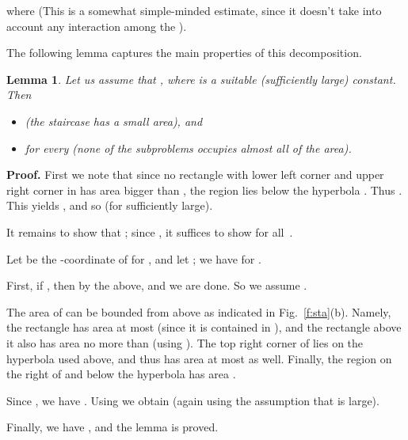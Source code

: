 \documentclass[11pt]{article}
\newtheorem{lemma}[theorem]{Lemma}
\newcommand{\qed}{\hspace{\stretch{1}}}
\newenvironment{proof}{\vspace{-.25\baselineskip}\noindent\textbf{Proof.}
}{\qed\par\medskip}
\begin{document}
where  (This is a somewhat simple-minded estimate, since it doesn't take
into account any interaction among the ).

The following lemma captures the main properties of this
decomposition.

\begin{lemma}\label{l:nobig}
Let us  assume that , where
 is a suitable (sufficiently large) constant.
Then 
\begin{itemize}\item 
 (the staircase has a small area), and
\item 
 
for every  (none of the subproblems
occupies almost all of the area).
\end{itemize}
\end{lemma}

\begin{proof} First we note that 
since no rectangle with lower left corner 
and upper right corner in  has area bigger than
, the region  lies below the hyperbola
. Thus
. This yields ,
and so 
(for  sufficiently large).


It remains to show that ;
since , it suffices to show 
 for all~.
 
Let  be the -coordinate of  for , and let ;
we have  for . 

First, if , then  by the above, and 
we are done. So we assume .

The area of  can be bounded from above as indicated
in Fig.~\ref{f:sta}(b). Namely, the rectangle  has area 
at most  (since it is contained in ), and
the rectangle  above it also has area no more than  
(using ).  The top right corner of 
lies on the hyperbola  used above, and thus 
has area at most  as well. Finally, the region 
on the right of  and below the hyperbola has area
.





Since , we 
have . Using 
we  obtain  (again using the assumption that  is large).

Finally, we have ,
and the lemma is proved.
\end{proof}
\end{document}
